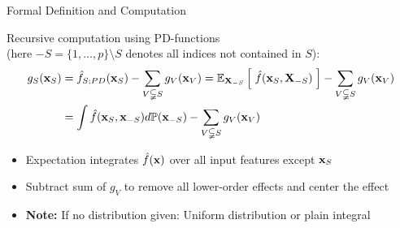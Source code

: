 \documentclass[10pt,compress,t,notes=noshow, xcolor=table]{beamer}
\newcommand{\Xv}{\mathbf{X}} %
\begin{document}
\begin{frame}{Formal Definition and Computation
}

\begin{definition}
    Recursive computation using PD-functions \\
    (here $-S = \{1, \ldots, p \} \setminus S$ denotes all indices not contained in \(S\)):
    \begin{align*}
    g_{S}(\xv_S)
        & = \fh_{S;PD}(\xv_S) - \sum_{V \subsetneqq S} g_V(\xv_V)
        = \mathbb{E}_{\Xv_{-S}} \left[ \; \fh(\xv_S, \Xv_{-S}) \; \right] - \sum_{V \subsetneqq S} g_V(\xv_V) \\
        & = \int \fh(\xv_S, \xv_{-S}) d \mathbb{P}(\xv_{-S}) - \sum_{V \subsetneqq S} g_V(\xv_V)
    \end{align*}
\end{definition}

\begin{itemize}
    \item Expectation integrates $\hat{f}(\mathbf{x})$ over all input features except $\mathbf{x}_S$
    \item Subtract sum of $g_V$ to remove all lower-order effects and center the effect
    \item \textbf{Note:} If no distribution given: Uniform distribution or plain integral
\end{itemize}

\end{frame}
\end{document}
